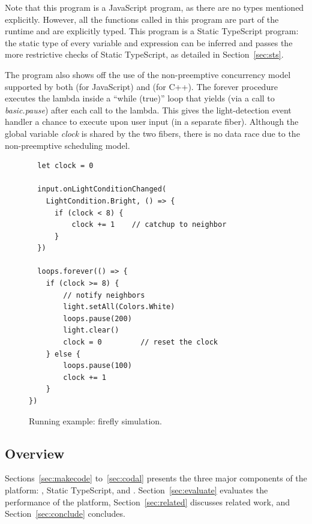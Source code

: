 Note that this program is a JavaScript program, as there are no
types mentioned explicitly. However, all the functions called in
this program are part of the runtime and are explicitly
typed. This program is a Static TypeScript program:
the static type of every variable and expression
can be inferred and passes the more restrictive checks
of Static TypeScript, as detailed in Section~\ref{sec:sts}.

The program also shows off the use of the non-preemptive concurrency
model supported by both \MC (for JavaScript) and \CO (for C++).
The forever procedure executes the lambda inside a ``while (true)''
loop that yields (via a call to \emph{basic.pause}) after each call to the lambda.
This gives the light-detection event handler a chance to execute
upon user input (in a separate fiber). Although the global variable \emph{clock} is
shared by the two fibers, there is no data race due to the non-preemptive
scheduling model.

\begin{figure}
\begin{lstlisting}
  let clock = 0

  input.onLightConditionChanged(
    LightCondition.Bright, () => {
      if (clock < 8) {
          clock += 1    // catchup to neighbor
      }
  })

  loops.forever(() => {
    if (clock >= 8) {
        // notify neighbors
        light.setAll(Colors.White)
        loops.pause(200)
        light.clear()
        clock = 0         // reset the clock
    } else {
        loops.pause(100)
        clock += 1
    }
})
\end{lstlisting}
\caption{\label{fig:example}Running example: firefly simulation.}
\end{figure}

\subsection{Overview}
Sections~\ref{sec:makecode} to~\ref{sec:codal} presents the three major components of the platform:
\MC, Static TypeScript, and \CO. Section~\ref{sec:evaluate} evaluates the performance of the platform,
Section~\ref{sec:related} discusses related work, and Section~\ref{sec:conclude}
concludes.